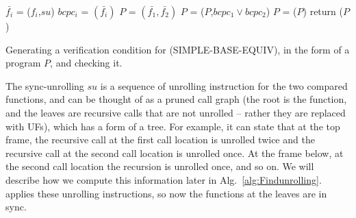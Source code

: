 \noindent
\begin{algorithm}
\begin{minipage}{\linewidth}
\begin{algorithmic}[1]
    \label{step:foreach_p}
	\State$\bar{f_i}$ = ($f_i$,$su$)
	\State $bcpc_i$ = $(\bar{f_i})$
	\EndFor
	\State $P$ = $(\bar{f_1},\bar{f_2})$
    \State $P$ = ($P$,$bcpc_1 \lor bcpc_2$) \label{step:assumebcpc12}
    \State $P$ = ($P$)
    \State return ($P$)
	\EndFunction
\end{algorithmic}
\end{minipage}
\caption{Generating a verification condition for (SIMPLE-BASE-EQUIV), in the form of a program $P$, and checking it.}
\label{alg:ExtendedBaseProof}
\end{algorithm}
The sync-unrolling $su$ is a sequence of unrolling instruction for the two compared functions, and can be thought of as a pruned call graph (the root is the function, and the leaves are recursive calls that are not unrolled -- rather they are replaced with UFs), which has a form of a tree. For example, it can state that at the top frame, the recursive call at the first call location is unrolled twice and the recursive call at the second call location is unrolled once. At the frame below, at the second call location the recursion is unrolled once, and so on. We will describe how we compute this information later in Alg.~\ref{alg:Findunrolling}.  applies these unrolling instructions, so now the functions at the leaves are in sync. 

